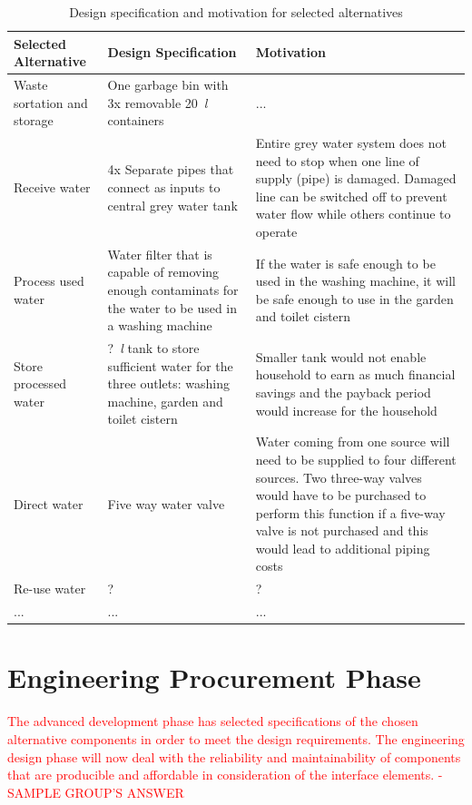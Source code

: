\documentclass[a4paper,11pt,fleqn]{report}
\begin{document}
\begin{table}[h!]
\caption {Design specification and motivation for selected alternatives} \label{tb: Functional_design_specs} 
\begin{center}
\begin{tabular}{p{4.5cm}|p{4.5cm}|p{4.5cm}}\toprule
	{\textbf{Selected Alternative}} & {\textbf{Design Specification}} & {\textbf{Motivation}}\\ \midrule
    \hline
    Waste sortation and storage & One garbage bin with 3x removable 20~\textit{l} containers& ...\\
        \hline
    Receive water & 4x Separate pipes that connect as inputs to central grey water tank & Entire grey water system does not need to stop when one line of supply (pipe) is damaged. Damaged line can be switched off to prevent water flow while others continue to operate\\
        \hline
    Process used water & Water filter that is capable of removing enough contaminats for the water to be used in a washing machine & If the water is safe enough to be used in the washing machine, it will be safe enough to use in the garden and toilet cistern\\
        \hline
    Store processed water & ?~\textit{l} tank to store sufficient water for the three outlets: washing machine, garden and toilet cistern & Smaller tank would not enable household to earn as much financial savings and the payback period would increase for the household\\
        \hline
    Direct water & Five way water valve & Water coming from one source will need to be supplied to four different sources. Two three-way valves would have to be purchased to perform this function if a five-way valve is not purchased and this would lead to additional piping costs\\
            \hline
    Re-use water & ? & ?\\
            \hline
    ... & ... & ...\\

    \bottomrule
\end{tabular}
\end{center}
\end{table}
%
\section{Engineering Procurement Phase}
\textcolor{red}{The advanced development phase has selected specifications of the chosen alternative components in order to meet the design requirements. The engineering design phase will now deal with the reliability and maintainability of components that are producible and affordable in consideration of the interface elements. - SAMPLE GROUP'S ANSWER}
\end{document}

